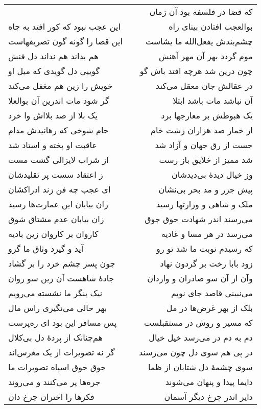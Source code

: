 \begin{center}
\begin{longtable}{l p{0.5cm} r}
&&
که قضا در فلسفه بود آن زمان
\\
این عجب نبود که کور افتد به چاه
&&
بوالعجب افتادن بینای راه
\\
این قضا را گونه گون تصریفهاست
&&
چشم‌بندش یفعل‌الله ما یشاست
\\
هم بداند هم نداند دل فنش
&&
موم گردد بهر آن مهر آهنش
\\
گوییی دل گویدی که میل او
&&
چون درین شد هرچه افتد باش گو
\\
خویش را زین هم مغفل می‌کند
&&
در عقالش جان معقل می‌کند
\\
گر شود مات اندرین آن بوالعلا
&&
آن نباشد مات باشد ابتلا
\\
یک بلا از صد بلااش وا خرد
&&
یک هبوطش بر معارجها برد
\\
خام شوخی که رهانیدش مدام
&&
از خمار صد هزاران زشت خام
\\
عاقبت او پخته و استاد شد
&&
جست از رق جهان و آزاد شد
\\
از شراب لایزالی گشت مست
&&
شد ممیز از خلایق باز رست
\\
ز اعتقاد سست پر تقلیدشان
&&
وز خیال دیدهٔ بی‌دیدشان
\\
ای عجب چه فن زند ادراکشان
&&
پیش جزر و مد بحر بی‌نشان
\\
زان بیابان این عمارت‌ها رسید
&&
ملک و شاهی و وزارتها رسید
\\
زان بیابان عدم مشتاق شوق
&&
می‌رسند اندر شهادت جوق جوق
\\
کاروان بر کاروان زین بادیه
&&
می‌رسد در هر مسا و غادیه
\\
آید و گیرد وثاق ما گرو
&&
که رسیدم نوبت ما شد تو رو
\\
چون پسر چشم خرد را بر گشاد
&&
زود بابا رخت بر گردون نهاد
\\
جادهٔ شاهست آن زین سو روان
&&
وآن از آن سو صادران و واردان
\\
نیک بنگر ما نشسته می‌رویم
&&
می‌نبینی قاصد جای نویم
\\
بهر حالی می‌نگیری راس مال
&&
بلک از بهر غرض‌ها در مل
\\
پس مسافر این بود ای ره‌پرست
&&
که مسیر و روش در مستقبلست
\\
هم‌چنانک از پردهٔ دل بی‌کلال
&&
دم به دم در می‌رسد خیل خیال
\\
گر نه تصویرات از یک مغرس‌اند
&&
در پی هم سوی دل چون می‌رسند
\\
جوق جوق اسپاه تصویرات ما
&&
سوی چشمهٔ دل شتابان از ظما
\\
جره‌ها پر می‌کنند و می‌روند
&&
دایما پیدا و پنهان می‌شوند
\\
فکرها را اختران چرخ دان
&&
دایر اندر چرخ دیگر آسمان
\\

\end{longtable}
\end{center}
